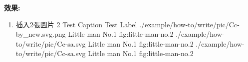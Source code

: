   \newpage

  {\bf 效果:}
  \begin{enumerate}
    \item
    {
      插入2張圖片
      \InsertMultiImages%
      {%
        {2} 
        {Test Caption}
        {Test Label}
      }%
      {%
        {./example/how-to/write/pic/Cc-by_new.svg.png}
        {Little man No.1}
        {fig:little-man-no.2}
      }%
      {%
        {./example/how-to/write/pic/Cc-sa.svg}
        {Little man No.1}
        {fig:little-man-no.2}
      }%
      {%
        {./example/how-to/write/pic/Cc-sa.svg}
        {Little man No.1}
        {fig:little-man-no.2}
      }%
    } %
  \end{enumerate}

\EndChapter
